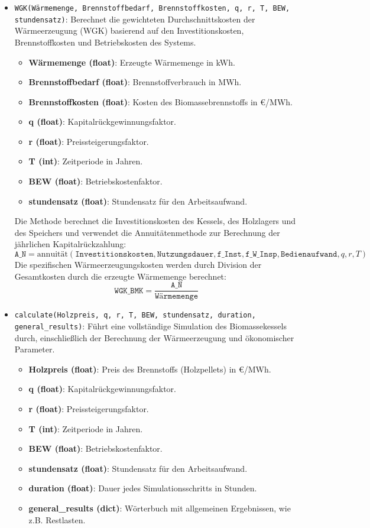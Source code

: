 \begin{itemize}
    \item \texttt{WGK(Wärmemenge, Brennstoffbedarf, Brennstoffkosten, q, r, T, BEW, stundensatz)}: Berechnet die gewichteten Durchschnittskosten der Wärmeerzeugung (WGK) basierend auf den Investitionskosten, Brennstoffkosten und Betriebskosten des Systems.
    \begin{itemize}
        \item \textbf{Wärmemenge (float)}: Erzeugte Wärmemenge in kWh.
        \item \textbf{Brennstoffbedarf (float)}: Brennstoffverbrauch in MWh.
        \item \textbf{Brennstoffkosten (float)}: Kosten des Biomassebrennstoffs in €/MWh.
        \item \textbf{q (float)}: Kapitalrückgewinnungsfaktor.
        \item \textbf{r (float)}: Preissteigerungsfaktor.
        \item \textbf{T (int)}: Zeitperiode in Jahren.
        \item \textbf{BEW (float)}: Betriebskostenfaktor.
        \item \textbf{stundensatz (float)}: Stundensatz für den Arbeitsaufwand.
    \end{itemize}
    
    Die Methode berechnet die Investitionskosten des Kessels, des Holzlagers und des Speichers und verwendet die Annuitätenmethode zur Berechnung der jährlichen Kapitalrückzahlung:
    \[
    \texttt{A\_N} = \text{annuität}(\texttt{Investitionskosten}, \texttt{Nutzungsdauer}, \texttt{f\_Inst}, \texttt{f\_W\_Insp}, \texttt{Bedienaufwand}, q, r, T)
    \]
    Die spezifischen Wärmeerzeugungskosten werden durch Division der Gesamtkosten durch die erzeugte Wärmemenge berechnet:
    \[
    \texttt{WGK\_BMK} = \frac{\texttt{A\_N}}{\texttt{Wärmemenge}}
    \]

    \item \texttt{calculate(Holzpreis, q, r, T, BEW, stundensatz, duration, general\_results)}: Führt eine vollständige Simulation des Biomassekessels durch, einschließlich der Berechnung der Wärmeerzeugung und ökonomischer Parameter.
    \begin{itemize}
        \item \textbf{Holzpreis (float)}: Preis des Brennstoffs (Holzpellets) in €/MWh.
        \item \textbf{q (float)}: Kapitalrückgewinnungsfaktor.
        \item \textbf{r (float)}: Preissteigerungsfaktor.
        \item \textbf{T (int)}: Zeitperiode in Jahren.
        \item \textbf{BEW (float)}: Betriebskostenfaktor.
        \item \textbf{stundensatz (float)}: Stundensatz für den Arbeitsaufwand.
        \item \textbf{duration (float)}: Dauer jedes Simulationsschritts in Stunden.
        \item \textbf{general\_results (dict)}: Wörterbuch mit allgemeinen Ergebnissen, wie z.B. Restlasten.
    \end{itemize}
    

\end{itemize}
